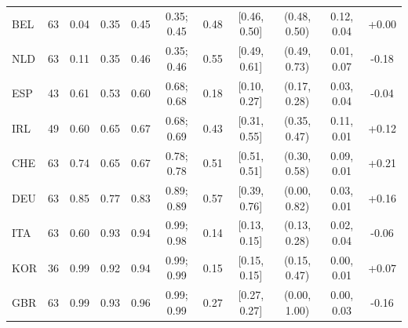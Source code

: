 \begin{tabular}{lrccccrcccc}
BEL & 63 & 0.04 & 0.35 & 0.45 & 0.35; 0.45 & 0.48 & [0.46, 0.50] & (0.48, 0.50) & 0.12, 0.04 & +0.00\\
NLD & 63 & 0.11 & 0.35 & 0.46 & 0.35; 0.46 & 0.55 & [0.49, 0.61] & (0.49, 0.73) & 0.01, 0.07 & -0.18\\
ESP & 43 & 0.61 & 0.53 & 0.60 & 0.68; 0.68 & 0.18 & [0.10, 0.27] & (0.17, 0.28) & 0.03, 0.04 & -0.04\\
IRL & 49 & 0.60 & 0.65 & 0.67 & 0.68; 0.69 & 0.43 & [0.31, 0.55] & (0.35, 0.47) & 0.11, 0.01 & +0.12\\
CHE & 63 & 0.74 & 0.65 & 0.67 & 0.78; 0.78 & 0.51 & [0.51, 0.51] & (0.30, 0.58) & 0.09, 0.01 & +0.21\\
DEU & 63 & 0.85 & 0.77 & 0.83 & 0.89; 0.89 & 0.57 & [0.39, 0.76] & (0.00, 0.82) & 0.03, 0.01 & +0.16\\
ITA & 63 & 0.60 & 0.93 & 0.94 & 0.99; 0.98 & 0.14 & [0.13, 0.15] & (0.13, 0.28) & 0.02, 0.04 & -0.06\\
KOR & 36 & 0.99 & 0.92 & 0.94 & 0.99; 0.99 & 0.15 & [0.15, 0.15] & (0.15, 0.47) & 0.00, 0.01 & +0.07\\
GBR & 63 & 0.99 & 0.93 & 0.96 & 0.99; 0.99 & 0.27 & [0.27, 0.27] & (0.00, 1.00) & 0.00, 0.03 & -0.16\\
\bottomrule\end{tabular}